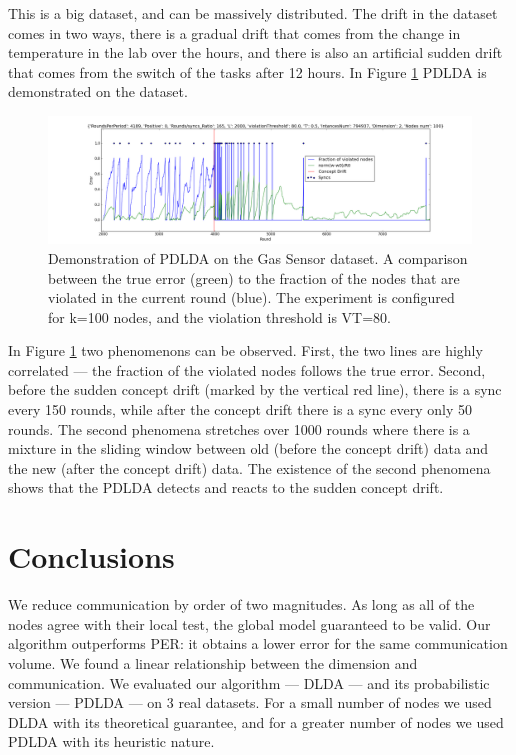 \documentclass[11pt,twocolumn,varwidth=true,a4paper,fleqn]{article}
\begin{document}
This is a big dataset, and can be massively distributed. The drift in
the dataset comes in two ways, there is a gradual drift that comes from 
the change in temperature in the lab over the hours, and there is also an
artificial sudden drift that comes from the switch of the tasks after 12 hours.
In Figure \ref{BigGasOverTime} PDLDA is demonstrated on the dataset.

\begin{figure}[ht!]
\centering
\includegraphics[width=\textwidth]{BigGas/overTime100k.png}
\caption{Demonstration of PDLDA on the Gas Sensor dataset. 
A comparison between the true error (green) to the fraction of the nodes that 
are violated in the current round (blue). 
The experiment is configured for k=100 nodes, and the violation threshold is
VT=80.}
\label{BigGasOverTime}
\end{figure}
In Figure \ref{BigGasOverTime} two phenomenons can be observed.
First, the two lines are highly correlated --- the fraction of the violated
nodes follows the true error. Second,  before the sudden concept drift 
(marked by the vertical red line), there is a sync every 150 rounds, while 
after the concept drift there is a sync every only 50 rounds.
The second phenomena stretches over 1000 rounds where there is a mixture in the 
sliding window between old (before the concept drift) data and the new 
(after the concept drift) data. The existence of the second phenomena shows that
the PDLDA detects and reacts to the sudden concept drift.


\section*{Conclusions}
We reduce communication by order of two magnitudes.
As long as all of the nodes agree with their local test, the
global model guaranteed to be valid. Our algorithm outperforms PER: it obtains a
lower error for the same communication volume. We found a linear relationship between the
dimension and communication. We evaluated our algorithm --- DLDA --- and its
probabilistic version --- PDLDA --- on 3 real datasets. For a small number of nodes we used 
DLDA with its theoretical guarantee, and for a greater number of nodes we used
PDLDA with its heuristic nature.
\end{document}
